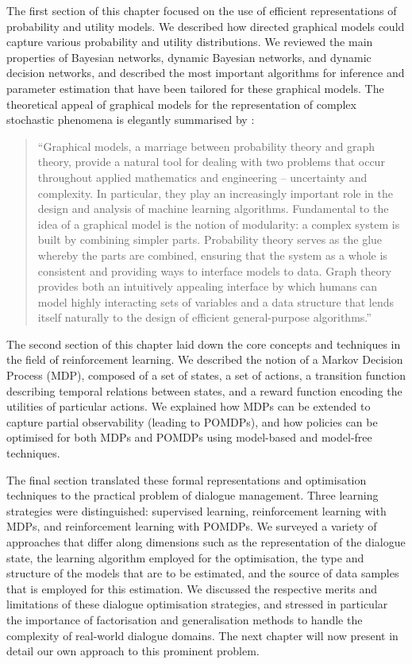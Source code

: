 The first section of this chapter focused on the use of efficient representations of probability and utility models.  We described how directed graphical models could capture various probability and utility distributions. We reviewed the main properties of Bayesian networks, dynamic Bayesian networks, and dynamic decision networks, and described the most important algorithms for inference and parameter estimation that have been tailored for these graphical models. The theoretical appeal of graphical models for the representation of complex stochastic phenomena is elegantly summarised by \citet[][p.~1]{jordan1998}: 
\begin{quote}
 ``Graphical models, a marriage between probability theory and graph theory, provide a natural tool for dealing with two problems that occur throughout applied mathematics and engineering -- uncertainty and complexity. In particular, they play an increasingly important role in the design and analysis of machine learning algorithms. Fundamental to the idea of a graphical model is the notion of modularity: a complex system is built by combining simpler parts. Probability theory serves as the glue whereby the parts are combined, ensuring that the system as a whole is consistent and providing ways to interface models to data. Graph theory provides both an intuitively appealing interface by which humans can model highly interacting sets of variables and a data structure that lends itself naturally to the design of efficient general-purpose algorithms.''
 \end{quote}

The second section of this chapter laid down the core concepts and techniques in the field of reinforcement learning.  We described the notion of a Markov Decision Process (MDP), composed of a set of states, a set of actions, a transition function describing temporal relations between states, and a reward function encoding the utilities of particular actions. We explained how MDPs can be extended to capture partial observability (leading to POMDPs), and how policies can be optimised for both MDPs and POMDPs using model-based and model-free techniques.

The final section translated these formal representations and optimisation techniques to the practical problem of dialogue management.  Three learning strategies were distinguished: supervised learning, reinforcement learning with MDPs, and reinforcement learning with POMDPs.  We surveyed a variety of approaches that differ along dimensions such as the representation of the dialogue state, the learning algorithm employed for the optimisation, the type and structure of the models that are to be estimated, and the source of data samples that is employed for this estimation. We discussed the respective merits and limitations of these dialogue optimisation strategies, and stressed in particular the importance of factorisation and generalisation methods to handle the complexity of real-world dialogue domains.  The next chapter will now present in detail our own approach to this prominent problem.

